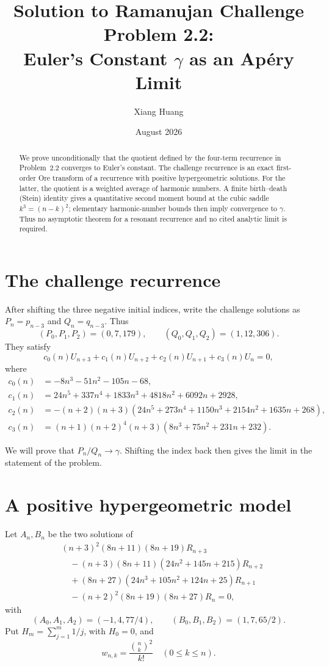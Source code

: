 \documentclass[11pt]{article}
\title{Solution to Ramanujan Challenge Problem 2.2:\\
Euler's Constant $\gamma$ as an Ap\'ery Limit}
\author{Xiang Huang}
\date{August 2026}
\begin{document}
\maketitle

\begin{abstract}
We prove unconditionally that the quotient defined by the four-term recurrence
in Problem~2.2 converges to Euler's constant.  The challenge recurrence is an
exact first-order Ore transform of a recurrence with positive hypergeometric
solutions.  For the latter, the quotient is a weighted average of harmonic
numbers.  A finite birth--death (Stein) identity gives a quantitative second
moment bound at the cubic saddle $k^3=(n-k)^2$; elementary harmonic-number
bounds then imply convergence to $\gamma$.  Thus no asymptotic theorem for a
resonant recurrence and no cited analytic limit is required.
\end{abstract}

\section{The challenge recurrence}

After shifting the three negative initial indices, write the challenge
solutions as $P_n=p_{n-3}$ and $Q_n=q_{n-3}$.  Thus
\[
 (P_0,P_1,P_2)=(0,7,179),\qquad
 (Q_0,Q_1,Q_2)=(1,12,306).
\]
They satisfy
\begin{equation}\label{eq:challenge}
 c_0(n)U_{n+3}+c_1(n)U_{n+2}+c_2(n)U_{n+1}+c_3(n)U_n=0,
\end{equation}
where
\begin{align*}
c_0(n)&=-8n^3-51n^2-105n-68,\\
c_1(n)&=24n^5+337n^4+1833n^3+4818n^2+6092n+2928,\\
c_2(n)&=-(n+2)(n+3)
 (24n^5+273n^4+1150n^3+2154n^2+1635n+268),\\
c_3(n)&=(n+1)(n+2)^4(n+3)(8n^3+75n^2+231n+232).
\end{align*}

We will prove that $P_n/Q_n\to\gamma$.  Shifting the index back then gives
the limit in the statement of the problem.

\section{A positive hypergeometric model}

Let $A_n,B_n$ be the two solutions of
\begin{align}
 &(n+3)^2(8n+11)(8n+19)R_{n+3}\nonumber\\
 &\quad -(n+3)(8n+11)(24n^2+145n+215)R_{n+2}\nonumber\\
 &\quad +(8n+27)(24n^3+105n^2+124n+25)R_{n+1}\nonumber\\
 &\quad -(n+2)^2(8n+19)(8n+27)R_n=0,                 \label{eq:rivoal}
\end{align}
with
\[
 (A_0,A_1,A_2)=(-1,4,77/4),\qquad
 (B_0,B_1,B_2)=(1,7,65/2).
\]
Put $H_m=\sum_{j=1}^m1/j$, with $H_0=0$, and
\[
 w_{n,k}=\frac{\binom nk^2}{k!}\quad(0\le k\le n).
\]
\end{document}
